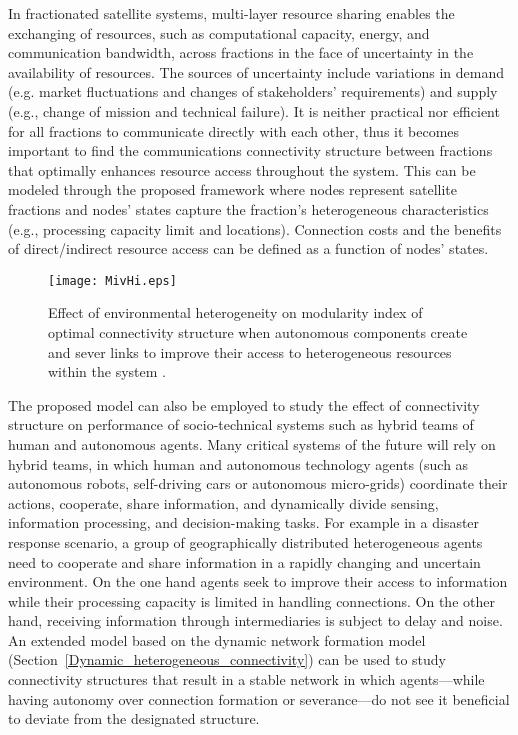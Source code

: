 \documentclass[journal,onecolumn]{IEEEtran}
\theoremstyle{plain}
\begin{document}
In fractionated satellite systems, multi-layer resource sharing enables the exchanging of resources, such as computational capacity, energy, and communication bandwidth, across fractions in the face of uncertainty in the availability of resources. The sources of uncertainty include variations in demand (e.g. market fluctuations and changes of stakeholders' requirements) and supply (e.g., change of mission and technical failure). It is neither practical nor efficient for all fractions to communicate directly with each other, thus it becomes important to find the communications connectivity structure between fractions that optimally enhances resource access throughout the system. This can be modeled through the proposed framework where nodes represent satellite fractions and nodes' states capture the fraction's heterogeneous characteristics (e.g., processing capacity limit and locations). Connection costs and the benefits of direct/indirect resource access can be defined as a function of nodes' states. 
\begin{figure}[!t]
\centering
\texttt{[image: MivHi.eps]}
\caption{Effect of environmental heterogeneity on modularity index of optimal connectivity structure when autonomous components create and sever links to improve their access to heterogeneous resources within the system \citep{heydari2015emergence}.}
\label{TEM_het_mod}
\end{figure}

The proposed model can also be employed to study the effect of connectivity structure on performance of socio-technical systems such as hybrid teams of human and autonomous agents. Many critical systems of the future will rely on hybrid teams, in which human and autonomous technology agents (such as autonomous robots, self-driving cars or autonomous micro-grids) coordinate their actions, cooperate, share information, and dynamically divide sensing, information processing, and decision-making tasks. For example in a disaster response scenario, a group of geographically distributed heterogeneous agents need to cooperate and share information in a rapidly changing and uncertain environment. On the one hand agents seek to improve their access to information while their processing capacity is limited in handling connections. On the other hand, receiving information through intermediaries is subject to delay and noise. An extended model based on the dynamic network formation model (Section~\ref{Dynamic_heterogeneous_connectivity}) can be used to study connectivity structures that result in a stable network in which agents---while having autonomy over connection formation or severance---do not see it beneficial to deviate from the designated structure. 
\end{document}
